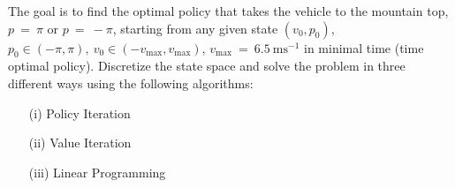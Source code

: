 \documentclass[uebung]{ETHIDSCprogramming_dpoc}
\begin{document}
The goal is to find the optimal policy that takes the vehicle to the mountain top, $p~=~\pi $ or  $p~=~-\pi $, starting from any given state $(v_0,p_0)$,  $p_0 \in (-\pi,\pi),\ v_0 \in (-v_\mathrm{max},v_\mathrm{max})$, $v_\mathrm{max}~=~6.5~\mathrm{ms}^{-1}$ in minimal time (time optimal policy). 
Discretize the state space and solve the problem in three different ways using the following algorithms:


\begin{itemize}
	\item[(i)] Policy Iteration
	\item[(ii)] Value Iteration
	\item[(iii)] Linear Programming
\end{itemize}
\end{document}
